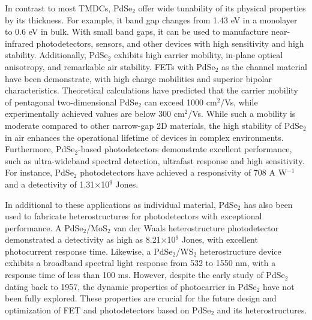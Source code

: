 \documentclass[twoside,twocolumn,9pt]{article}
\begin{document}
In contrast to most TMDCs, PdSe$_2$ offer wide tunability of its physical properties by its thickness. For example, it band gap changes from 1.43 eV in a monolayer to 0.6 eV in bulk.\cite{sun2015electronic} With small band gaps, it can be used to manufacture near-infrared photodetectors, sensors, and other devices with high sensitivity and high stability. Additionally, PdSe$_2$ exhibits high carrier mobility,\cite{gu2020two}  in-plane optical anisotropy,\cite{oyedele2017pdse2} and remarkable air stability.\cite{hoffman2019exploring} FETs with PdSe$_2$ as the channel material have been demonstrate, with high charge mobilities and superior bipolar characteristics.\cite{qin2018monolayer}  Theoretical calculations have predicted that the carrier mobility of pentagonal two-dimensional PdSe$_2$ can exceed 1000 cm$^{2}$/Vs, while experimentally achieved values are below 300 cm$^{2}$/Vs.\cite{gu2020two,sun2015electronic,chow2017high,Di2020Electron} While such a mobility is moderate compared to other narrow-gap 2D materials, the high stability of PdSe$_2$ in air enhances the operational lifetime of devices in complex environments. Furthermore, PdSe$_2$-based photodetectors demonstrate excellent performance, such as ultra-wideband spectral detection, ultrafast response and high sensitivity.\cite{long2019palladium,lu2020layer,2020High} For instance, PdSe$_2$ photodetectors have achieved a responsivity of 708 A W$^{-1}$ and a detectivity of 1.31×10$^{9}$ Jones.\cite{2019High}

In additional to these applications as individual material, PdSe$_2$ has also been used to fabricate heterostructures for photodetectors with exceptional performance. A PdSe$_2$/MoS$_2$ van der Waals heterostructure photodetector demonstrated a detectivity as high as 8.21×10$^{9}$ Jones, with excellent photocurrent response time.\cite{long2019palladium} Likewise, a PdSe$_2$/WS$_2$ heterostructure device exhibits a broadband spectral light response from 532 to 1550 nm, with a response time of less than 100 ms.\cite{kang2021van} However, despite the early study of PdSe$_2$ dating back to 1957,\cite{gronvold1957crystal} the dynamic properties of photocarrier in PdSe$_2$ have not been fully explored. These properties are crucial for the future design and optimization of FET and photodetectors based on PdSe$_2$ and its heterostructures.
\end{document}
